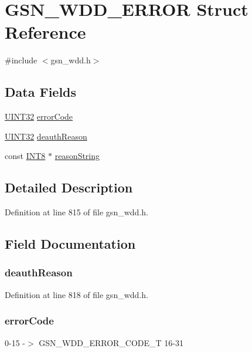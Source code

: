 \hypertarget{a00274}{
\section{GSN\_\-WDD\_\-ERROR Struct Reference}
\label{a00274}
}


{\ttfamily \#include $<$gsn\_\-wdd.h$>$}

\subsection*{Data Fields}
\begin{DoxyCompactItemize}
\item 
\hyperlink{a00660_gae1e6edbbc26d6fbc71a90190d0266018}{UINT32} \hyperlink{a00274_a4728ab152afb6611e07faa07e4fadf4b}{errorCode}
\item 
\hyperlink{a00660_gae1e6edbbc26d6fbc71a90190d0266018}{UINT32} \hyperlink{a00274_a2426f8d4cd4da004f46bf6d23b81c23f}{deauthReason}
\item 
const \hyperlink{a00660_ga307b8734c020247f6bac4fcde0dcfbb9}{INT8} $\ast$ \hyperlink{a00274_a3fee925dbc50dacdd4663217479ca4a7}{reasonString}
\end{DoxyCompactItemize}


\subsection{Detailed Description}


Definition at line 815 of file gsn\_\-wdd.h.



\subsection{Field Documentation}
\hypertarget{a00274_a2426f8d4cd4da004f46bf6d23b81c23f}{
\subsubsection[{deauthReason}]{ {\bf deauthReason}}}
\label{a00274_a2426f8d4cd4da004f46bf6d23b81c23f}


Definition at line 818 of file gsn\_\-wdd.h.

\hypertarget{a00274_a4728ab152afb6611e07faa07e4fadf4b}{
\subsubsection[{errorCode}]{ {\bf errorCode}}}
\label{a00274_a4728ab152afb6611e07faa07e4fadf4b}
0-\/15 -\/$>$ GSN\_\-WDD\_\-ERROR\_\-CODE\_\-T 16-\/31 

